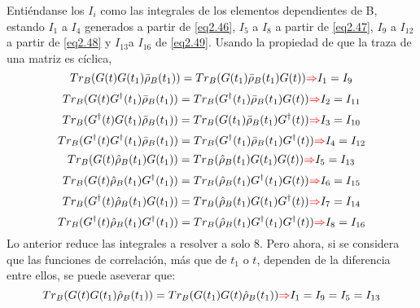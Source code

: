 \documentclass{book}
\begin{document}
 Entiéndanse los $I_i$ como las integrales de los elementos dependientes de B, estando $I_1$ a $I_4$ generados a partir de \textcolor{blue}{\ref{eq2.46}}, $I_5$ a $I_8$ a partir de \textcolor{blue}{\ref{eq2.47}}, $I_9$ a $I_{12}$ a partir de \textcolor{blue}{\ref{eq2.48}} y $I_{13}$a $I_{16}$ de \textcolor{blue}{\ref{eq2.49}}.
 Usando la propiedad de que la traza de una matriz es cíclica, 
 \begin{equation}\label{eq2.51} {Tr_B(G(t)G(t_1)\bar{\rho}_B(t_1))=Tr_B(G(t_1)\bar{\rho}_B(t_1)G(t))\textcolor{red}{\Rightarrow} I_{1}=I_{9} }\end{equation}
 \begin{equation}\label{eq2.52} {Tr_B(G(t)G^\dag(t_1)\bar{\rho}_B(t_1))=Tr_B(G^\dag(t_1)\bar{\rho}_B(t_1)G(t))\textcolor{red}{\Rightarrow} I_{2}=I_{11}}\end{equation}
 \begin{equation}\label{eq2.53}{ Tr_B(G^\dag(t)G(t_1)\bar{\rho}_B(t_1))=Tr_B(G(t_1)\bar{\rho}_B(t_1)G^\dag(t))\textcolor{red}{\Rightarrow} I_{3}=I_{10} }\end{equation}
 \begin{equation}\label{eq2.54}{Tr_B(G^\dag(t)G^\dag(t_1)\bar{\rho}_B(t_1))=Tr_B(G^\dag(t_1)\bar{\rho}_B(t_1)G^\dag(t))\textcolor{red}{\Rightarrow} I_{4}=I_{12}}\end{equation}
 \begin{equation} \label{eq2.55}{ Tr_B(G(t)\hat{\rho}_B(t_1)G(t_1))=Tr_B(\hat{\rho}_B(t_1)G(t_1)G(t)) \textcolor{red}{\Rightarrow} I_{5}=I_{13}
}\end{equation}
\begin{equation}\label{eq2.56} {Tr_B(G(t)\hat{\rho}_B(t_1)G^\dag(t_1))=Tr_B(\hat{\rho}_B(t_1)G^\dag(t_1)G(t)) \textcolor{red}{\Rightarrow} I_{6}=I_{15} }\end{equation}
\begin{equation}\label{eq2.57}{Tr_B(G^\dag(t)\hat{\rho}_B(t_1)G(t_1))=Tr_B(\hat{\rho}_B(t_1)G(t_1)G^\dag(t)) \textcolor{red}{\Rightarrow} I_{7}=I_{14}}\end{equation}
\begin{equation}\label{eq2.58} {Tr_B(G^\dag(t)\hat{\rho}_B(t_1)G^\dag(t_1))=Tr_B(\hat{\rho}_B(t_1)G^\dag(t_1)G^\dag(t)) \textcolor{red}{\Rightarrow} I_{8}=I_{16} }\end{equation}
 Lo anterior reduce las integrales a resolver a solo 8. Pero ahora, si se considera que las funciones de correlación, más que de $t_1$ o $t$, dependen de la diferencia entre ellos, se puede aseverar que:
 \begin{equation}\label{eq2.59}{Tr_B(G(t)G(t_1)\hat{\rho}_B(t_1))=Tr_B(G(t_1)G(t)\hat{\rho}_B(t_1)) \textcolor{red}{\Rightarrow} I_1=I_9=I_5=I_{13}}\end{equation}
\end{document}
